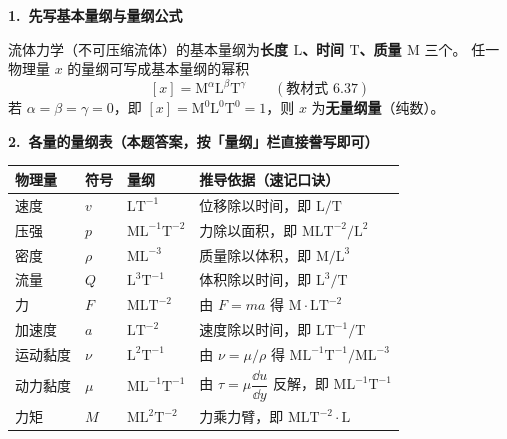 \begin{jie}
\textbf{1.\ 先写基本量纲与量纲公式}

流体力学（不可压缩流体）的基本量纲为\textbf{长度 $\mathrm{L}$、时间 $\mathrm{T}$、质量 $\mathrm{M}$} 三个。
任一物理量 $x$ 的量纲可写成基本量纲的幂积
\[ [x]=\mathrm{M}^{\alpha}\mathrm{L}^{\beta}\mathrm{T}^{\gamma}\qquad(\text{教材式 6.37}) \]
若 $\alpha=\beta=\gamma=0$，即 $[x]=\mathrm{M^{0}L^{0}T^{0}}=1$，则 $x$ 为\textbf{无量纲量}（纯数）。

\textbf{2.\ 各量的量纲表（本题答案，按「量纲」栏直接誊写即可）}

\begin{center}
\begin{tabularx}{\textwidth}{@{}>{\raggedright\arraybackslash}p{3.6em}
  >{\raggedright\arraybackslash}p{2.2em}
  >{\raggedright\arraybackslash}p{7.5em}
  X@{}}
\toprule
物理量 & 符号 & 量纲 & 推导依据（速记口诀） \\
\midrule
速度 & $v$ & $\mathrm{LT^{-1}}$ & 位移除以时间，即 $\mathrm{L/T}$ \\
压强 & $p$ & $\mathrm{ML^{-1}T^{-2}}$ & 力除以面积，即 $\mathrm{MLT^{-2}/L^{2}}$ \\
密度 & $\rho$ & $\mathrm{ML^{-3}}$ & 质量除以体积，即 $\mathrm{M/L^{3}}$ \\
流量 & $Q$ & $\mathrm{L^{3}T^{-1}}$ & 体积除以时间，即 $\mathrm{L^{3}/T}$ \\
力 & $F$ & $\mathrm{MLT^{-2}}$ & 由 $F=ma$ 得 $\mathrm{M\cdot LT^{-2}}$ \\
加速度 & $a$ & $\mathrm{LT^{-2}}$ & 速度除以时间，即 $\mathrm{LT^{-1}/T}$ \\
运动黏度 & $\nu$ & $\mathrm{L^{2}T^{-1}}$ & 由 $\nu=\mu/\rho$ 得 $\mathrm{ML^{-1}T^{-1}/ML^{-3}}$ \\
动力黏度 & $\mu$ & $\mathrm{ML^{-1}T^{-1}}$ & 由 $\tau=\mu\dfrac{\dd u}{\dd y}$ 反解，即 $\mathrm{ML^{-1}T^{-1}}$ \\
力矩 & $M$ & $\mathrm{ML^{2}T^{-2}}$ & 力乘力臂，即 $\mathrm{MLT^{-2}\cdot L}$ \\
\bottomrule
\end{tabularx}
\end{center}


\end{jie}
